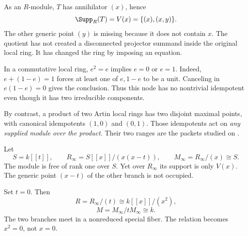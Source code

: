 As an $R$-module, $T$ has annihilator $(x)$, hence
\[
\Supp_R(T)=V(x)=\{(x),(x,y)\}.
\]
The other generic point $(y)$ is missing because it does not contain $x$. The quotient has not created a disconnected projector summand inside the original local ring. It has changed the ring by imposing an equation.

In a commutative local ring, $e^2=e$ implies $e=0$ or $e=1$. Indeed, $e+(1-e)=1$ forces at least one of $e,1-e$ to be a unit. Canceling in $e(1-e)=0$ gives the conclusion. Thus this node has no nontrivial idempotent even though it has two irreducible components.

By contrast, a product of two Artin local rings has two disjoint maximal points, with canonical idempotents $(1,0)$ and $(0,1)$. Those idempotents act on \emph{any supplied module over the product}. Their two ranges are the packets studied on .


Let
\[
S=k[[t]],\qquad R_\infty=S[[x]]/(x(x-t)),\qquad
M_\infty=R_\infty/(x)\cong S.
\]
The module is free of rank one over $S$. Yet over $R_\infty$ its support is only $V(x)$. The generic point $(x-t)$ of the other branch is not occupied.

\begin{minipage}[c]{.47\linewidth}
\end{minipage}\hfill
\begin{minipage}[c]{.49\linewidth}
Set $t=0$. Then
\[
R=R_\infty/(t)\cong k[[x]]/(x^2),
\]
\[
M=M_\infty/tM_\infty\cong k.
\]
The two branches meet in a nonreduced special fiber. The relation becomes $x^2=0$, not $x=0$.
\end{minipage}

